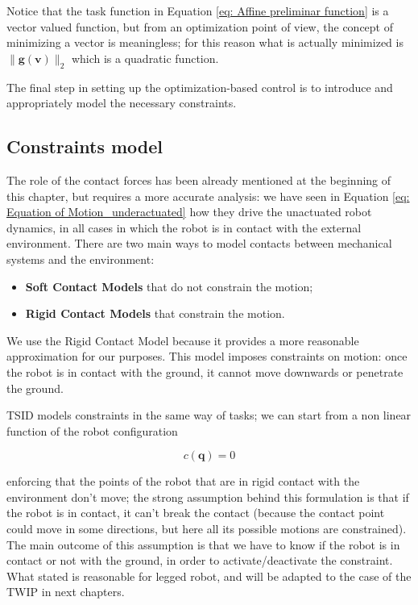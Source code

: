 Notice that the task function in Equation \eqref{eq: Affine preliminar function} is a vector valued function, but from an optimization point of view, the concept of minimizing a vector is meaningless; for this reason what is actually minimized is $\|\mathbf{g}(\mathbf{v})\|_2$ which is a quadratic function.

The final step in setting up the optimization-based control is to introduce and appropriately model the necessary constraints.

\subsection{Constraints model}
\label{subsec:Constraints model}

The role of the contact forces has been already mentioned at the beginning of this chapter, but requires a more accurate analysis:
we have seen in Equation \eqref{eq: Equation of Motion_underactuated} how they drive the unactuated robot dynamics, in all cases in which the robot is in contact with the external environment.
There are two main ways to model contacts between mechanical systems and the environment:

\begin{itemize}
    \item \textbf{Soft Contact Models} that do not constrain the motion;
    \item \textbf{Rigid Contact Models} that constrain the motion.
\end{itemize}

We use the Rigid Contact Model because it provides a more reasonable approximation for our purposes. This model imposes constraints on motion: once the robot is in contact with the ground, it cannot move downwards or penetrate the ground.

TSID models constraints in the same way of tasks; we can start from a non linear function of the robot configuration

\begin{equation}
    c(\mathbf{q}) = 0
    \label{eq: contact point general constraint}
\end{equation}

enforcing that the points of the robot that are in rigid contact with the environment don't move; the strong assumption behind this formulation is that if the robot is in contact, it can't break the contact (because the contact point could move in some directions, but here all its possible motions are constrained).
The main outcome of this assumption is that we have to know if the robot is in contact or not with the ground, in order to activate/deactivate the constraint. 
What stated is reasonable for legged robot, and will be adapted to the case of the TWIP in next chapters.

